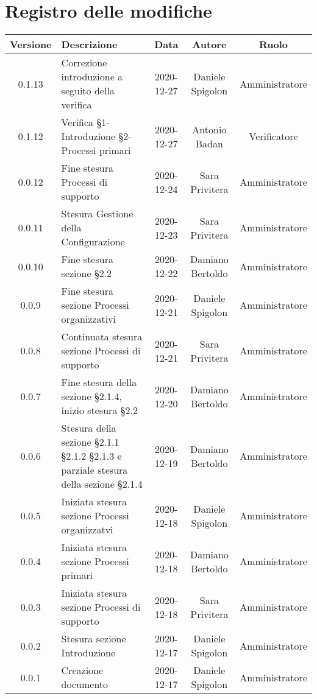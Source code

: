 \section*{Registro delle modifiche}

\begin{center}
	\begin{longtable}{|c|p{5cm}|c|c|c|}
	\hline
	\rowcolor{lighter-grayer}
	\textbf{Versione} & \textbf{Descrizione} & \textbf{Data} & \textbf{Autore} & \textbf{Ruolo} \\
	\hline
	\endfirsthead

	
	0.1.13 & Correzione introduzione a seguito della verifica  & 2020-12-27 & Daniele Spigolon & Amministratore \\
	\hline
	0.1.12 & Verifica §1-Introduzione §2-Processi primari  & 2020-12-27 & Antonio Badan & Verificatore \\
	\hline
	0.0.12 & Fine stesura Processi di supporto & 2020-12-24 & Sara Privitera & Amministratore \\
	\hline
	0.0.11 & Stesura Gestione della Configurazione & 2020-12-23 & Sara Privitera & Amministratore \\
	\hline
	0.0.10 & Fine stesura sezione §2.2 & 2020-12-22 & Damiano Bertoldo & Amministratore \\
	\hline
	0.0.9 & Fine stesura sezione Processi organizzativi & 2020-12-21 & Daniele Spigolon & Amministratore \\
	\hline
	0.0.8 & Continuata stesura sezione Processi di supporto & 2020-12-21 & Sara Privitera & Amministratore \\
	\hline
	0.0.7 & Fine stesura della sezione §2.1.4, inizio stesura §2.2 & 2020-12-20 & Damiano Bertoldo & Amministratore \\
	\hline
	0.0.6 & Stesura della sezione §2.1.1 §2.1.2 §2.1.3 e parziale stesura della sezione §2.1.4 & 2020-12-19 & Damiano Bertoldo & Amministratore \\
	\hline
	0.0.5 & Iniziata stesura sezione Processi organizzatvi & 2020-12-18 & Daniele Spigolon & Amministratore \\
	\hline
	0.0.4 & Iniziata stesura sezione Processi primari & 2020-12-18 & Damiano Bertoldo & Amministratore \\
	\hline
	0.0.3 & Iniziata stesura sezione Processi di supporto & 2020-12-18 & Sara Privitera & Amministratore \\
	\hline
	0.0.2 & Stesura sezione Introduzione & 2020-12-17 & Daniele Spigolon & Amministratore \\
	\hline
	0.0.1 & Creazione documento & 2020-12-17 & Daniele Spigolon & Amministratore \\
	\hline
	
	

	\end{longtable}
\end{center}
